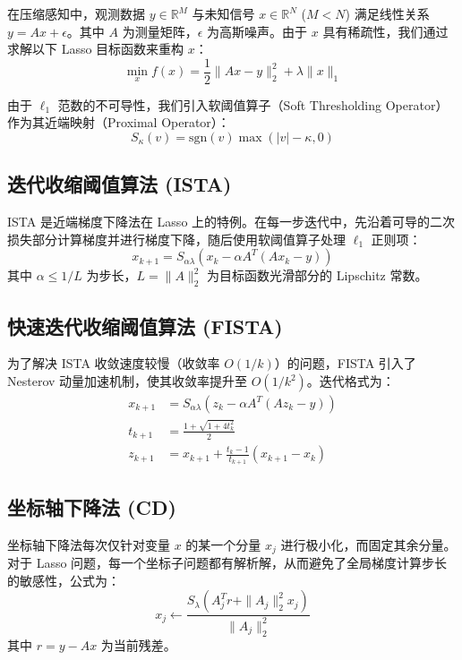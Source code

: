 \documentclass[12pt, a4paper]{ctexart}
\begin{document}
在压缩感知中，观测数据 $y \in \mathbb{R}^M$ 与未知信号 $x \in \mathbb{R}^N$ ($M < N$) 满足线性关系 $y = Ax + \epsilon$。其中 $A$ 为测量矩阵，$\epsilon$ 为高斯噪声。由于 $x$ 具有稀疏性，我们通过求解以下 Lasso 目标函数来重构 $x$：
\begin{equation}
    \min_{x} f(x) = \frac{1}{2} \|Ax - y\|_2^2 + \lambda \|x\|_1
\end{equation}

由于 $\ell_1$ 范数的不可导性，我们引入软阈值算子（Soft Thresholding Operator）作为其近端映射（Proximal Operator）：
\begin{equation}
    S_{\kappa}(v) = \text{sgn}(v) \max(|v| - \kappa, 0)
\end{equation}

\subsection{迭代收缩阈值算法 (ISTA)}
ISTA 是近端梯度下降法在 Lasso 上的特例。在每一步迭代中，先沿着可导的二次损失部分计算梯度并进行梯度下降，随后使用软阈值算子处理 $\ell_1$ 正则项：
\begin{equation}
    x_{k+1} = S_{\alpha\lambda}\left( x_k - \alpha A^T(Ax_k - y) \right)
\end{equation}
其中 $\alpha \le 1/L$ 为步长，$L = \|A\|_2^2$ 为目标函数光滑部分的 Lipschitz 常数。

\subsection{快速迭代收缩阈值算法 (FISTA)}
为了解决 ISTA 收敛速度较慢（收敛率 $O(1/k)$）的问题，FISTA 引入了 Nesterov 动量加速机制，使其收敛率提升至 $O(1/k^2)$。迭代格式为：
\begin{align}
    x_{k+1} &= S_{\alpha\lambda}\left( z_k - \alpha A^T(Az_k - y) \right) \\
    t_{k+1} &= \frac{1 + \sqrt{1 + 4t_k^2}}{2} \\
    z_{k+1} &= x_{k+1} + \frac{t_k - 1}{t_{k+1}}(x_{k+1} - x_k)
\end{align}

\subsection{坐标轴下降法 (CD)}
坐标轴下降法每次仅针对变量 $x$ 的某一个分量 $x_j$ 进行极小化，而固定其余分量。对于 Lasso 问题，每一个坐标子问题都有解析解，从而避免了全局梯度计算步长的敏感性，公式为：
\begin{equation}
    x_j \leftarrow \frac{S_{\lambda}(A_j^T r + \|A_j\|_2^2 x_j)}{\|A_j\|_2^2}
\end{equation}
其中 $r = y - Ax$ 为当前残差。
\end{document}

